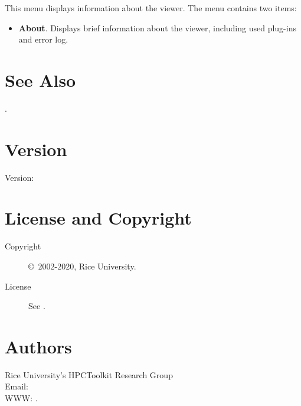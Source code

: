 \documentclass[english]{article}
\begin{document}
This menu displays information about the viewer. The menu contains two items:
\begin{itemize}

\item \textbf{About}.
  Displays brief information about the viewer, including used plug-ins and error log.

\end{itemize}





\section{See Also}

.

\section{Version}

Version: \Version

\section{License and Copyright}

\begin{description}
\item[Copyright] \copyright\ 2002-2020, Rice University.
\item[License] See .
\end{description}

\section{Authors}

\noindent
Rice University's HPCToolkit Research Group \\
Email:  \\
WWW: .

\LatexManEnd
\end{document}
